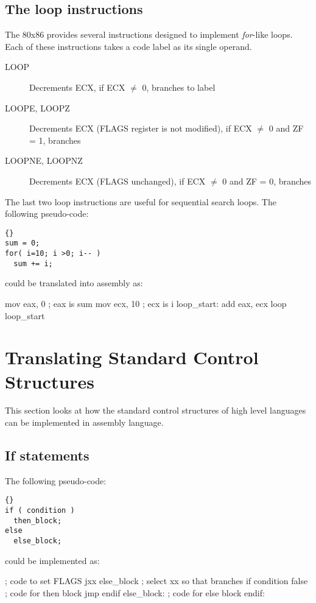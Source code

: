 \subsection{The loop instructions}

The 80x86 provides several instructions designed to implement 
\emph{for}-like loops. Each of these instructions takes a code label
as its single operand.
\begin{description}
\item[LOOP] 
Decrements ECX, if ECX $\neq$ 0, branches to label
\item[LOOPE, LOOPZ]
 
Decrements ECX (FLAGS register is not modified), if
                    ECX $\neq$ 0 and ZF = 1, branches
\item[LOOPNE, LOOPNZ]
 
Decrements ECX (FLAGS unchanged), if ECX $\neq$ 0
                      and ZF = 0, branches
\end{description}

The last two loop instructions are useful for sequential search loops. The
following pseudo-code:
\begin{lstlisting}[stepnumber=0]{}
sum = 0;
for( i=10; i >0; i-- )
  sum += i;
\end{lstlisting}
\noindent could be translated into assembly as:
\begin{AsmCodeListing}[frame=none]
      mov    eax, 0          ; eax is sum
      mov    ecx, 10         ; ecx is i
loop_start:
      add    eax, ecx
      loop   loop_start
\end{AsmCodeListing}

\section{Translating Standard Control Structures}

This section looks at how the standard control structures of high level
languages can be implemented in assembly language.

\subsection{If statements }
The following pseudo-code:
\begin{lstlisting}[stepnumber=0]{}
if ( condition )
  then_block;
else
  else_block;
\end{lstlisting}
\noindent could be implemented as:
\begin{AsmCodeListing}[frame=none]
      ; code to set FLAGS
      jxx    else_block    ; select xx so that branches if condition false
      ; code for then block
      jmp    endif
else_block:
      ; code for else block
endif:
\end{AsmCodeListing}

